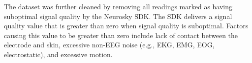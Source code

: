 The dataset was further cleaned by removing all readings marked as having suboptimal signal quality by the Neurosky SDK. The SDK delivers a signal quality value that is greater than zero when signal quality is suboptimal. Factors causing this value to be greater than zero include lack of contact between the electrode and skin, excessive non-EEG noise (e.g., EKG, EMG, EOG, electrostatic), and excessive motion.


